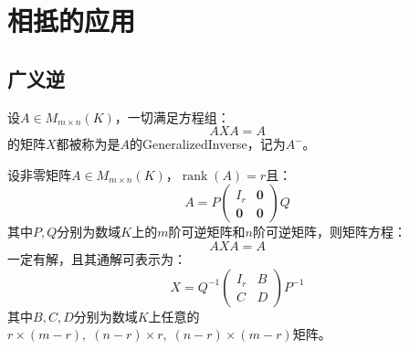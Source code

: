 \section{相抵的应用}

\subsection{广义逆}
\begin{definition}
	设$A\in M_{m\times n}(K)$，一切满足方程组：
	\begin{equation*}
		AXA=A
	\end{equation*}
	的矩阵$X$都被称为是$A$的\gls{GeneralizedInverse}，记为$A^-$。
\end{definition}
\begin{theorem}\label{theo:ExistenceOfGeneralizedInverse}
	设非零矩阵$A\in M_{m\times n}(K)$，$\operatorname{rank}(A)=r$且：
	\begin{equation*}
		A=P
		\begin{pmatrix}
			I_r & \mathbf{0} \\
			\mathbf{0} & \mathbf{0}
		\end{pmatrix}
		Q
	\end{equation*}
	其中$P,Q$分别为数域$K$上的$m$阶可逆矩阵和$n$阶可逆矩阵，则矩阵方程：
	\begin{equation*}
		AXA=A
	\end{equation*}
	一定有解，且其通解可表示为：
	\begin{equation*}
		X=Q^{-1}
		\begin{pmatrix}
			I_r & B \\
			C & D
		\end{pmatrix}
		P^{-1}
	\end{equation*}
	其中$B,C,D$分别为数域$K$上任意的$r\times (m-r),\;(n-r)\times r,\;(n-r)\times(m-r)$矩阵。
\end{theorem}
